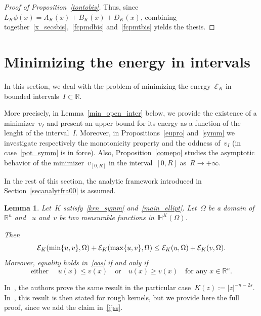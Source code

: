 \documentclass[10pt,a4paper]{amsart}
\newtheorem{lemma}[theorem]{Lemma}
\numberwithin{equation}{section}
\newcommand{\R}{\mathbb{R}}
\newcommand{\Ec}{\mathcal{E}_K}
\newcommand{\Hbb}{\mathbb{H}^K}
\begin{document}
\begin{proof}[Proof of Proposition~\ref{tontobis}]
Thus, since~$L_K\phi(x)= A_K(x) + B_K(x) + D_K(x)$,
combining together~\eqref{x_secsbis},~\eqref{fcpmdbis} and~\eqref{fcpmtbis} yields the thesis.
\end{proof}    

\section{Minimizing the energy in intervals}\label{min_on_int}
In this section, we deal with the problem of minimizing the energy~$\Ec$ in bounded intervals~$I \subset \R$.

More precisely, in Lemma~\ref{min_open_inter} below, we provide the existence of a minimizer~$v_{I}$ and present an upper bound for its energy as a function of the lenght of the interval~$ I$. Moreover, in Propositions~\ref{eupro} and~\ref{symm} we investigate respectively the monotonicity property and the oddness of~$v_I$ (in case~\eqref{pot_symm} is in force). Also, Proposition~\ref{comepo} studies the asymptotic behavior of the minimizer~$v_{[0,R]}$ in the interval~$[0,R]$ as~$R\to+\infty$.
\medskip

In the rest of this section, the analytic framework introduced
in Section~\ref{secanalytfra00} is assumed.

\begin{lemma}\label{leaj}
Let~$K$ satisfy~\eqref{krn_symm} and~\eqref{main_ellipt}.
Let~$\Omega$ be a domain of~$\R^n$ and ~$u$ and~$v$ be two measurable functions in~$\Hbb(\Omega)$.

Then
\begin{equation}\label{oas}
\Ec({\rm min}\{u,v\},\Omega) + \Ec({\rm max}\{u,v\},\Omega) \leq \Ec(u, \Omega) + \Ec(v,\Omega).
\end{equation}
Moreover, equality holds in~\eqref{oas} if and only if
\begin{equation}\label{jjss}
{\mbox{either }} \quad u(x) \leq v(x) \quad\mbox{or}\quad u(x)\ge v(x) \quad\mbox{for any } x \in \R^n.
\end{equation}
\end{lemma}

In~\cite[Lemma~3]{PSV13}, the authors prove the same result in the particular case~$K(z):=|z|^{-n-2s}$. In~\cite[Lemma~3.2]{CozziValdNONLINEARITY}, this result is then stated for rough kernels,
but we provide here the full proof, since we add the claim in~\eqref{jjss}.
\end{document}
